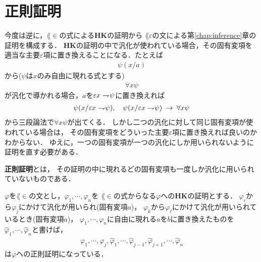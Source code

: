\section{正則証明}
	今度は逆に，$\lang{\in}$の式による{\bf HK}の証明から
	$\lang{\varepsilon}$の文による第\ref{chap:inference}章の証明を構成する．
	{\bf HK}の証明の中で汎化が使われている場合，その固有変項を
	適当な主要$\varepsilon$項に置き換えることになる．たとえば
	\begin{align}
		\psi(x/a)
	\end{align}
	から($\psi$は$x$のみ自由に現れる式とする)
	\begin{align}
		\forall x \psi
	\end{align}
	が汎化で導かれる場合，$a$を$\varepsilon x \rightharpoondown\hspace{-0.25em} \psi$に置き換えれば
	\begin{align}
		\psi(x/\varepsilon x \rightharpoondown\hspace{-0.25em} \psi), 
		\quad \psi(x/\varepsilon x \rightharpoondown\hspace{-0.25em} \psi) \hspace{0.25em}\rightarrow\hspace{0.25em} \forall x \psi
	\end{align}
	から三段論法で$\forall x \psi$が出てくる．
	しかし二つの汎化に対して同じ固有変項が使われている場合は，
	その固有変項をどういった主要$\varepsilon$項に置き換えれば良いのかわからない．
	ゆえに，一つの固有変項が一つの汎化にしか用いられないように証明を直す必要がある．
	
	\begin{screen}
		\begin{metadfn}[正則証明]
			{\bf 正則証明}とは，
			その証明の中に現れるどの固有変項も一度しか汎化に用いられていないものである．
		\end{metadfn}
	\end{screen}
	
	\begin{screen}
		\begin{metathm}[どんな証明も正則化できる]
			
		\end{metathm}
	\end{screen}
	
	\begin{metaprf}
		$\varphi$を$\lang{\in}$の文とし，$\varphi_{1},\cdots,\varphi_{n}$を
		$\lang{\in}$の式からなる$\varphi$への{\bf HK}の証明とする．
		$\varphi_{i}$から$\varphi_{j}$にかけて汎化が用いられ(固有変項$a$)，
		$\varphi_{k}$から$\varphi_{\ell}$にかけて汎化が用いられているとき(固有変項$a$)，
		$\varphi_{1},\cdots,\varphi_{n}$に自由に現れる$a$を$b$に置き換えたものを
		$\hat{\varphi}_{1},\cdots,\hat{\varphi}_{n}$と書けば，
		\begin{align}
			\varphi_{1},\cdots,\varphi_{j},
			\hat{\varphi}_{1},\cdots,\hat{\varphi}_{j-1},\hat{\varphi}_{j+1},
			\cdots,\hat{\varphi}_{n}
		\end{align}
		は$\varphi$への正則証明になっている．
		\QED
	\end{metaprf}
	
